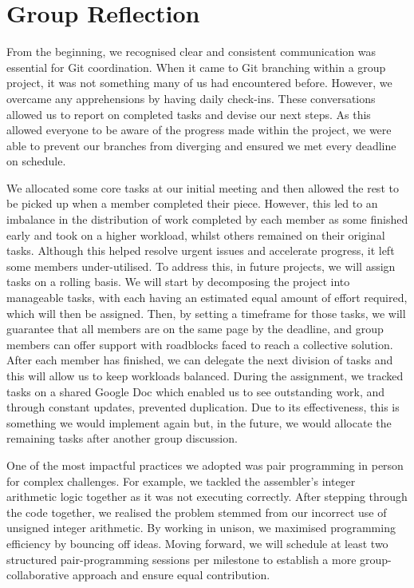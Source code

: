\documentclass[11pt]{article}
\begin{document}
\section{Group Reflection}

From the beginning, we recognised clear and consistent communication was essential for Git 
coordination. When it came to Git branching within a group project, it was not something many of us 
had encountered before. However, we overcame any apprehensions by having daily check-ins. 
These conversations allowed us to report on completed tasks and devise our next steps. As this 
allowed everyone to be aware of the progress made within the project, we were able to prevent our 
branches from diverging and ensured we met every deadline on schedule.

We allocated some core tasks at our initial meeting and then allowed the rest to be picked up when a 
member completed their piece. However, this led to an imbalance in the distribution of work completed 
by each member as some finished early and took on a higher workload, whilst others remained on their 
original tasks. Although this helped resolve urgent issues and accelerate progress, it left some 
members under-utilised. To address this, in future projects, we will assign tasks on a rolling basis. 
We will start by decomposing the project into manageable tasks, with each having an estimated 
equal amount of effort required, which will then be assigned. Then, by setting a timeframe for 
those tasks, we will guarantee that all members are on the same page by the deadline, and group members 
can offer support with roadblocks faced to reach a collective solution. After each member has 
finished, we can delegate the next division of tasks and this will allow us to keep workloads balanced. 
During the assignment, we tracked tasks on a shared Google Doc which enabled us to see outstanding work, 
and through constant updates, prevented duplication. Due to its effectiveness, this is something we would 
implement again but, in the future, we would allocate the remaining tasks after another group discussion.

One of the most impactful practices we adopted was pair programming in person for complex 
challenges. For example, we tackled the assembler’s integer arithmetic logic together as it was not 
executing correctly. After stepping through the code together, we realised the problem stemmed from 
our incorrect use of unsigned integer arithmetic. By working in unison, we maximised programming 
efficiency by bouncing off ideas. Moving forward, we will schedule at least two structured 
pair-programming sessions per milestone to establish a more group-collaborative approach and ensure 
equal contribution.
\end{document}
